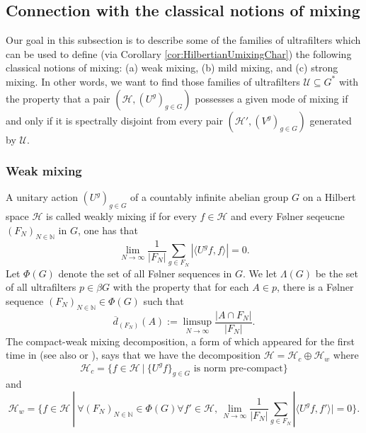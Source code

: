 \documentclass[graybox]{svmult}
\theoremstyle{definition}
\newcommand{\N}{\mathbb{N}}
\begin{document}
\subsection{Connection with the classical notions of mixing}
Our goal in this subsection is to  describe some of the families of ultrafilters which can be used to define (via Corollary \ref{cor:HilbertianUmixingChar})  the following classical notions of mixing: (a) weak mixing,  (b) mild mixing, and (c) strong mixing. 
In other words, we want to find those families of ultrafilters $\mathcal U\subseteq G^*$ with the property that a pair $(\mathcal H,(U^g)_{g\in G})$ possesses a given mode of mixing if and only if it is spectrally disjoint from every pair $(\mathcal H',(V^g)_{g\in G})$ generated by $\mathcal U
$.
\subsubsection{Weak mixing}\label{sssec:WeakMixing}
A unitary action $(U^g)_{g\in G}$ of a countably infinite abelian group $G$ on a Hilbert space $\mathcal H$ is called weakly mixing if for every $f\in \mathcal H$ and every F{\o}lner seqeucne $(F_N)_{N\in\N}$ in $G$, one has that 
\begin{equation}\label{eq:WeakMixingFormula}
\lim_{N\rightarrow\infty}\frac{1}{|F_N|}\sum_{g\in F_N}|\langle U^gf,f\rangle|=0.
\end{equation}
Let $\Phi(G)$ denote the set of all F{\o}lner sequences in $G$. We let $\Lambda(G)$ be the set of all ultrafilters $p\in\beta G$ with the property that for each $A\in p$,  there is a F{\o}lner sequence $(F_N)_{N\in\N}\in \Phi(G)$ such that 
    $$
    \overline d_{(F_N)}(A):=\limsup_{N\rightarrow\infty}\frac{|A\cap F_N|}{|F_N|}.
    $$
The compact-weak mixing decomposition, a form of which appeared for the first time in  \cite{KoopmanVonNeumannContinuousSpectra} (see also \cite[Theorem 3.4, page 96]{Krengel1985ErgodicTheorems} or
\cite[Theorem 2.3]{ERTAnUpdate}), says that we have the decomposition $\mathcal{H} = \mathcal{H}_c\oplus\mathcal{H}_w$ where
\begin{equation*}
    \mathcal{H}_c = \{f \in \mathcal{H}\ |\ \{U^gf\}_{g \in G}\text{ is norm pre-compact}\}
\end{equation*}
and 
\begin{equation*}
    \mathcal{H}_w = \{f \in \mathcal{H}\ |\ \forall (F_N)_{N\in\N}\in\Phi(G)\forall f'\in \mathcal H,\,  \lim_{N\rightarrow\infty}\frac{1}{|F_N|}\sum_{g\in F_N}|\langle U^gf,f'\rangle| = 0\}.
\end{equation*}
\end{document}
